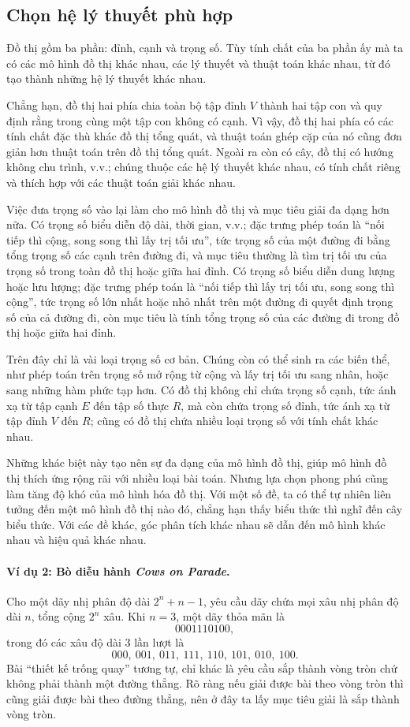 \documentclass[11pt]{article}
\begin{document}
\subsection{Chọn hệ lý thuyết phù hợp}

Đồ thị gồm ba phần: đỉnh, cạnh và trọng số. Tùy tính chất của ba phần ấy mà
ta có các mô hình đồ thị khác nhau, các lý thuyết và thuật toán khác nhau,
từ đó tạo thành những hệ lý thuyết khác nhau.

Chẳng hạn, đồ thị hai phía chia toàn bộ tập đỉnh \(V\) thành hai tập con và
quy định rằng trong cùng một tập con không có cạnh. Vì vậy, đồ thị hai phía
có các tính chất đặc thù khác đồ thị tổng quát, và thuật toán ghép cặp của nó
cũng đơn giản hơn thuật toán trên đồ thị tổng quát. Ngoài ra còn có cây, đồ
thị có hướng không chu trình, v.v.; chúng thuộc các hệ lý thuyết khác nhau,
có tính chất riêng và thích hợp với các thuật toán giải khác nhau.

Việc đưa trọng số vào lại làm cho mô hình đồ thị và mục tiêu giải đa dạng hơn
nữa. Có trọng số biểu diễn độ dài, thời gian, v.v.; đặc trưng phép toán là
``nối tiếp thì cộng, song song thì lấy trị tối ưu'', tức trọng số của một
đường đi bằng tổng trọng số các cạnh trên đường đi, và mục tiêu thường là tìm
trị tối ưu của trọng số trong toàn đồ thị hoặc giữa hai đỉnh. Có trọng số
biểu diễn dung lượng hoặc lưu lượng; đặc trưng phép toán là ``nối tiếp thì
lấy trị tối ưu, song song thì cộng'', tức trọng số lớn nhất hoặc nhỏ nhất
trên một đường đi quyết định trọng số của cả đường đi, còn mục tiêu là tính
tổng trọng số của các đường đi trong đồ thị hoặc giữa hai đỉnh.

Trên đây chỉ là vài loại trọng số cơ bản. Chúng còn có thể sinh ra các biến
thể, như phép toán trên trọng số mở rộng từ cộng và lấy trị tối ưu sang nhân,
hoặc sang những hàm phức tạp hơn. Có đồ thị không chỉ chứa trọng số cạnh, tức
ánh xạ từ tập cạnh \(E\) đến tập số thực \(R\), mà còn chứa trọng số đỉnh,
tức ánh xạ từ tập đỉnh \(V\) đến \(R\); cũng có đồ thị chứa nhiều loại trọng
số với tính chất khác nhau.

Những khác biệt này tạo nên sự đa dạng của mô hình đồ thị, giúp mô hình đồ
thị thích ứng rộng rãi với nhiều loại bài toán. Nhưng lựa chọn phong phú cũng
làm tăng độ khó của mô hình hóa đồ thị. Với một số đề, ta có thể tự nhiên
liên tưởng đến một mô hình đồ thị nào đó, chẳng hạn thấy biểu thức thì nghĩ
đến cây biểu thức. Với các đề khác, góc phân tích khác nhau sẽ dẫn đến mô
hình khác nhau và hiệu quả khác nhau.

\paragraph{Ví dụ 2: Bò diễu hành \textit{Cows on Parade}.}
Cho một dãy nhị phân độ dài \(2^n+n-1\), yêu cầu dãy chứa mọi xâu nhị phân độ
dài \(n\), tổng cộng \(2^n\) xâu. Khi \(n=3\), một dãy thỏa mãn là
\[
  0001110100,
\]
trong đó các xâu độ dài \(3\) lần lượt là
\[
  000,\ 001,\ 011,\ 111,\ 110,\ 101,\ 010,\ 100.
\]
Bài ``thiết kế trống quay'' tương tự, chỉ khác là yêu cầu sắp thành vòng
tròn chứ không phải thành một đường thẳng. Rõ ràng nếu giải được bài theo
vòng tròn thì cũng giải được bài theo đường thẳng, nên ở đây ta lấy mục tiêu
giải là sắp thành vòng tròn.
\end{document}
